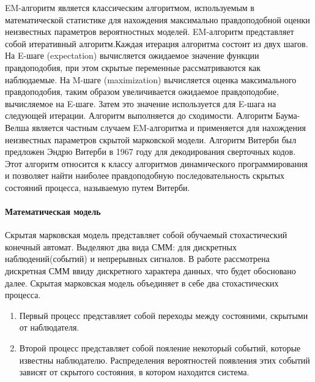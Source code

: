 EM-алгоритм является классическим алгоритмом, используемым в математической статистике для нахождения максимально правдоподобной оценки неизвестных параметров вероятностных моделей. EM-алгоритм представляет собой итеративный алгоритм.Каждая итерация алгоритма состоит из двух шагов. На E-шаге (expectation) вычисляется ожидаемое значение функции правдоподобия, при этом скрытые переменные рассматриваются как наблюдаемые. На M-шаге (maximization) вычисляется оценка максимального правдоподобия, таким образом увеличивается ожидаемое правдоподобие, вычисляемое на E-шаге. Затем это значение используется для E-шага на следующей итерации. Алгоритм выполняется до сходимости. Алгоритм Баума-Велша является частным случаем EM-алгоритма и применяется для нахождения неизвестных параметров скрытой марковской модели. Алгоритм Витерби был предложен Эндрю Витерби в 1967 году для декодирования сверточных кодов\cite{viterbi1967error}. Этот алгоритм относится к классу алгоритмов динамического программирования и позволяет найти наиболее правдоподобную последовательность скрытых состояний процесса, называемую путем Витерби.

\paragraph{Математическая модель}
Скрытая марковская модель представляет собой обучаемый стохастический конечный автомат. Выделяют два вида СММ: для дискретных наблюдений(событий) и непрерывных сигналов. В работе рассмотрена дискретная СММ ввиду дискретного характера данных, что будет обосновано далее. Скрытая марковская модель объединяет в себе два стохастических процесса.
\begin{enumerate}
\item
Первый процесс представляет собой переходы между состояними, скрытыми от наблюдателя.
\item
Второй процесс представляет собой пояление некоторый событий, которые известны наблюдателю. Распределения вероятностей появления этих событий зависят от скрытого состояния, в котором находится система.
\end{enumerate}


